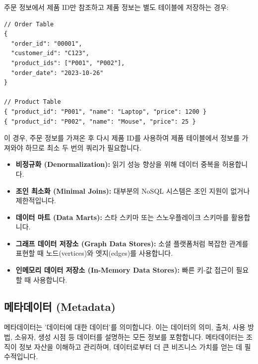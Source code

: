 \documentclass[11pt,a4paper]{article}
\theoremstyle{definition}
\begin{document}
\begin{tcolorbox}[example, title=데이터 참조 예시]
주문 정보에서 제품 ID만 참조하고 제품 정보는 별도 테이블에 저장하는 경우:
\begin{verbatim}
// Order Table
{
  "order_id": "00001",
  "customer_id": "C123",
  "product_ids": ["P001", "P002"],
  "order_date": "2023-10-26"
}

// Product Table
{ "product_id": "P001", "name": "Laptop", "price": 1200 }
{ "product_id": "P002", "name": "Mouse", "price": 25 }
\end{verbatim}
이 경우, 주문 정보를 가져온 후 다시 제품 ID를 사용하여 제품 테이블에서 정보를 가져와야 하므로 최소 두 번의 쿼리가 필요합니다.
\end{tcolorbox}

\begin{tcolorbox}[summary, title=NoSQL 모델링 규칙]
\begin{itemize}
    \item \textbf{비정규화 (Denormalization):} 읽기 성능 향상을 위해 데이터 중복을 허용합니다.
    \item \textbf{조인 최소화 (Minimal Joins):} 대부분의 NoSQL 시스템은 조인 지원이 없거나 제한적입니다.
    \item \textbf{데이터 마트 (Data Marts):} 스타 스키마 또는 스노우플레이크 스키마를 활용합니다.
    \item \textbf{그래프 데이터 저장소 (Graph Data Stores):} 소셜 플랫폼처럼 복잡한 관계를 표현할 때 노드(vertices)와 엣지(edges)를 사용합니다.
    \item \textbf{인메모리 데이터 저장소 (In-Memory Data Stores):} 빠른 키-값 접근이 필요할 때 사용합니다.
\end{itemize}
\end{tcolorbox}

\subsection{메타데이터 (Metadata)}

\begin{tcolorbox}[definition, title=메타데이터란?]
메타데이터는 '데이터에 대한 데이터'를 의미합니다. 이는 데이터의 의미, 출처, 사용 방법, 소유자, 생성 시점 등 데이터를 설명하는 모든 정보를 포함합니다. 메타데이터는 조직이 정보 자산을 이해하고 관리하며, 데이터로부터 더 큰 비즈니스 가치를 얻는 데 필수적입니다.
\end{tcolorbox}
\end{document}
